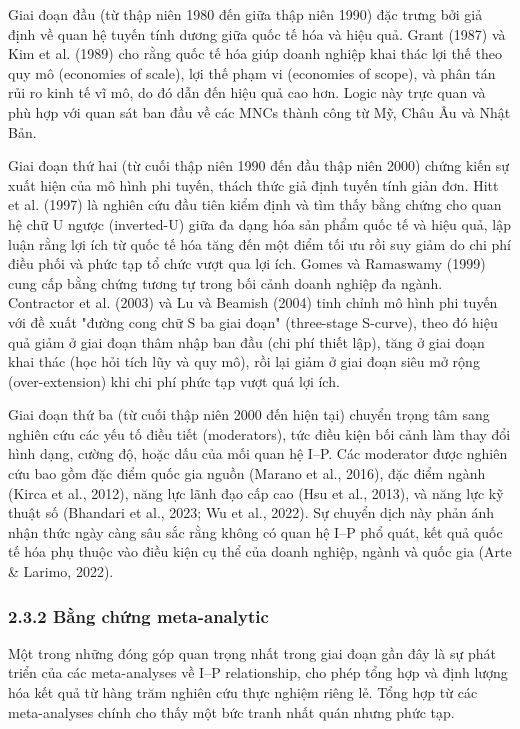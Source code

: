 \documentclass[12pt,a4paper]{article}
\begin{document}
Giai đoạn đầu (từ thập niên 1980 đến giữa thập niên 1990) đặc trưng bởi
giả định về quan hệ tuyến tính dương giữa quốc tế hóa và hiệu quả. Grant
(1987) và Kim et al. (1989) cho rằng quốc tế hóa giúp doanh nghiệp khai
thác lợi thế theo quy mô (economies of scale), lợi thế phạm vi
(economies of scope), và phân tán rủi ro kinh tế vĩ mô, do đó dẫn đến
hiệu quả cao hơn. Logic này trực quan và phù hợp với quan sát ban đầu về
các MNCs thành công từ Mỹ, Châu Âu và Nhật Bản.

Giai đoạn thứ hai (từ cuối thập niên 1990 đến đầu thập niên 2000) chứng
kiến sự xuất hiện của mô hình phi tuyến, thách thức giả định tuyến tính
giản đơn. Hitt et al. (1997) là nghiên cứu đầu tiên kiểm định và tìm
thấy bằng chứng cho quan hệ chữ U ngược (inverted-U) giữa đa dạng hóa
sản phẩm quốc tế và hiệu quả, lập luận rằng lợi ích từ quốc tế hóa tăng
đến một điểm tối ưu rồi suy giảm do chi phí điều phối và phức tạp tổ
chức vượt qua lợi ích. Gomes và Ramaswamy (1999) cung cấp bằng chứng
tương tự trong bối cảnh doanh nghiệp đa ngành. Contractor et al. (2003)
và Lu và Beamish (2004) tinh chỉnh mô hình phi tuyến với đề xuất "đường
cong chữ S ba giai đoạn" (three-stage S-curve), theo đó hiệu quả giảm ở
giai đoạn thâm nhập ban đầu (chi phí thiết lập), tăng ở giai đoạn khai
thác (học hỏi tích lũy và quy mô), rồi lại giảm ở giai đoạn siêu mở rộng
(over-extension) khi chi phí phức tạp vượt quá lợi ích.

Giai đoạn thứ ba (từ cuối thập niên 2000 đến hiện tại) chuyển trọng tâm
sang nghiên cứu các yếu tố điều tiết (moderators), tức điều kiện bối
cảnh làm thay đổi hình dạng, cường độ, hoặc dấu của mối quan hệ I--P.
Các moderator được nghiên cứu bao gồm đặc điểm quốc gia nguồn (Marano et
al., 2016), đặc điểm ngành (Kirca et al., 2012), năng lực lãnh đạo cấp
cao (Hsu et al., 2013), và năng lực kỹ thuật số (Bhandari et al., 2023;
Wu et al., 2022). Sự chuyển dịch này phản ánh nhận thức ngày càng sâu
sắc rằng không có quan hệ I--P phổ quát, kết quả quốc tế hóa phụ thuộc
vào điều kiện cụ thể của doanh nghiệp, ngành và quốc gia (Arte \&
Larimo, 2022).

\hypertarget{232-bux1eb1ng-chux1ee9ng-meta-analytic}{%
\subsubsection{2.3.2 Bằng chứng
meta-analytic}\label{232-bux1eb1ng-chux1ee9ng-meta-analytic}}

Một trong những đóng góp quan trọng nhất trong giai đoạn gần đây là sự
phát triển của các meta-analyses về I--P relationship, cho phép tổng hợp
và định lượng hóa kết quả từ hàng trăm nghiên cứu thực nghiệm riêng lẻ.
Tổng hợp từ các meta-analyses chính cho thấy một bức tranh nhất quán
nhưng phức tạp.
\end{document}
